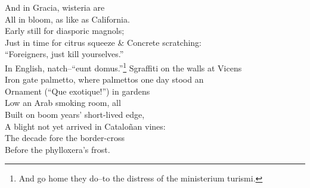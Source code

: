 And in Gracia, wisteria are \\
All in bloom, as like as California. \\
Early still for diasporic magnols; \\
Just in time for citrus squeeze \& 
Concrete scratching: \\
``Foreigners, just kill yourselves.'' \\
In English, natch--``eunt domus.''\footnote{And go home they do--to the distress of the ministerium turismi.}
Sgraffiti on the walls at Vicens \\
Iron gate palmetto, where palmettos one day stood an \\
Ornament (``Que exotique!'') in gardens \\
Low an Arab smoking room, all \\
Built on boom years' short-lived edge, \\
A blight not yet arrived in Cataloñan vines: \\
The decade fore the border-cross \\
Before the phylloxera's frost.

